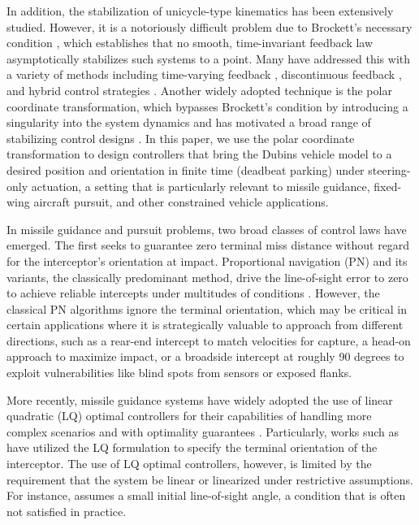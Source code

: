 \documentclass[letterpaper, 10 pt, conference]{ieeeconf}  %
\begin{document}
In addition, the stabilization of unicycle-type kinematics has been extensively studied. However, it is a notoriously difficult problem due to Brockett’s necessary condition \cite{brockett1983asymptotic}, which establishes that no smooth, time-invariant feedback law asymptotically stabilizes such systems to a point. Many have addressed this with a variety of methods including time-varying feedback \cite{pomet1992explicit,coron1993smooth}, discontinuous feedback \cite{de2000stabilization,bloch1996stabilization_slidingmode}, and hybrid control strategies \cite{hespanha1999_hybrid_stabilization,prieur2003robust}. Another widely adopted technique is the polar coordinate transformation, which bypasses Brockett’s condition by introducing a singularity into the system dynamics and has motivated a broad range of stabilizing control designs \cite{todorovski2025_CLF,Kim2025_IOC,badreddin1993fuzzy,aicardi1995,astolfi1999exponential}. In this paper, we use the polar coordinate transformation to design controllers that bring the Dubins vehicle model to a desired position and orientation in finite time (deadbeat parking) under steering-only actuation, a setting that is particularly relevant to missile guidance, fixed-wing aircraft pursuit, and other constrained vehicle applications.

In missile guidance and pursuit problems, two broad classes of control laws have emerged. The first seeks to guarantee zero terminal miss distance without regard for the interceptor’s orientation at impact. Proportional navigation (PN) and its variants, the classically predominant method, drive the line-of-sight error to zero to achieve reliable intercepts under multitudes of conditions \cite{zarchan2012tactical,siouris2004missile}. However, the classical PN algorithms ignore the terminal orientation, which may be critical in certain applications where it is strategically valuable to approach from different directions, such as a rear-end intercept to match velocities for capture, a head-on approach to maximize impact, or a broadside intercept at roughly 90 degrees to exploit vulnerabilities like blind spots from sensors or exposed flanks.

More recently, missile guidance systems have widely adopted the use of linear quadratic (LQ) optimal controllers for their capabilities of handling more complex scenarios and with optimality guarantees \cite{palumbo2010modern}. Particularly, works such as \cite{ryoo2005optimal,ryoo2006time,shaferman2008linear} have utilized the LQ formulation to specify the terminal orientation of the interceptor. The use of LQ optimal controllers, however, is limited by the requirement that the system be linear or linearized under restrictive assumptions. For instance, \cite{ryoo2005optimal} assumes a small initial line-of-sight angle, a condition that is often not satisfied in practice.
\end{document}
